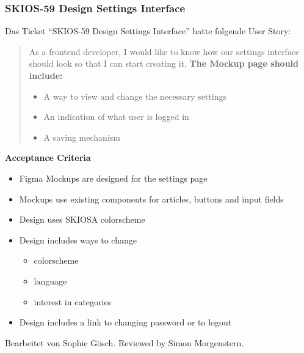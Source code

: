 \subsubsection{SKIOS-59 Design Settings Interface}
Das Ticket \enquote{SKIOS-59 Design Settings Interface} hatte folgende User Story:
\begin{quotation}
    As a frontend developer, I would like to know how our settings interface should look so that I can start creating it.
    \textbf{The Mockup page should include:}
        \begin{itemize}
            \item A way to view and change the necessary settings
            \item An indication of what user is logged in
            \item A saving mechanism
        \end{itemize}
\end{quotation}
\textbf{Acceptance Criteria}
    \begin{itemize}
        \item Figma Mockups are designed for the settings page
        \item Mockups use existing components for articles, buttons and input fields
        \item Design uses SKIOSA colorscheme
        \item Design includes ways to change
        \begin{itemize}
            \item colorscheme
            \item language
            \item interest in categories
        \end{itemize}
        \item Design includes a link to changing password or to logout 
    \end{itemize}
Bearbeitet von Sophie Gösch.
Reviewed by Simon Morgenstern.

